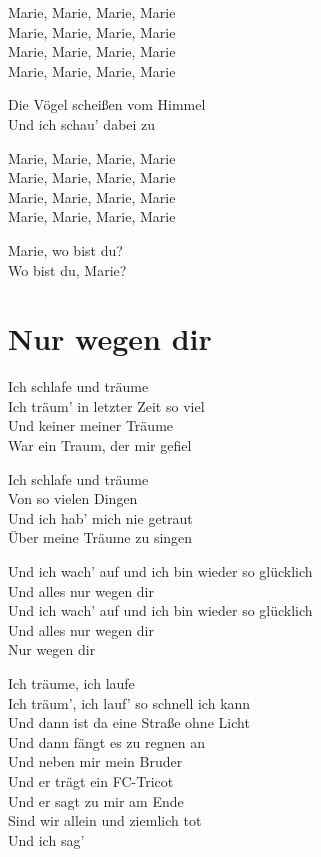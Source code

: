 \documentclass[]{book}
\begin{document}
Marie, Marie, Marie, Marie\\
Marie, Marie, Marie, Marie\\
Marie, Marie, Marie, Marie\\
Marie, Marie, Marie, Marie

Die Vögel scheißen vom Himmel\\
Und ich schau' dabei zu

Marie, Marie, Marie, Marie\\
Marie, Marie, Marie, Marie\\
Marie, Marie, Marie, Marie\\
Marie, Marie, Marie, Marie

Marie, wo bist du?\\
Wo bist du, Marie?

\hypertarget{nur-wegen-dir}{%
\section{Nur wegen dir}\label{nur-wegen-dir}}

Ich schlafe und träume\\
Ich träum' in letzter Zeit so viel\\
Und keiner meiner Träume\\
War ein Traum, der mir gefiel

Ich schlafe und träume\\
Von so vielen Dingen\\
Und ich hab' mich nie getraut\\
Über meine Träume zu singen

Und ich wach' auf und ich bin wieder so glücklich\\
Und alles nur wegen dir\\
Und ich wach' auf und ich bin wieder so glücklich\\
Und alles nur wegen dir\\
Nur wegen dir

Ich träume, ich laufe\\
Ich träum', ich lauf' so schnell ich kann\\
Und dann ist da eine Straße ohne Licht\\
Und dann fängt es zu regnen an\\
Und neben mir mein Bruder\\
Und er trägt ein FC-Tricot\\
Und er sagt zu mir am Ende\\
Sind wir allein und ziemlich tot\\
Und ich sag'
\end{document}

